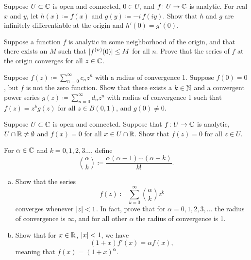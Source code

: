 \begin{exercise}
Suppose $U \subset {\mathbb{C}}$ is open and connected, $0 \in U$, and $f \colon U
\to {\mathbb{C}}$ is analytic.  For real $x$ and $y$,
let $h(x) \coloneqq f(x)$ and $g(y) \coloneqq -i \, f(iy)$.
Show that $h$ and $g$ are infinitely differentiable at the origin and
$h'(0) = g'(0)$.
\end{exercise}

\begin{exercise}
Suppose a function $f$ is analytic in some neighborhood of the origin,
and that there exists an $M$
such that $\lvert {f^{(n)}(0)} \rvert \leq M$ for all $n$.
Prove that the series of $f$ at the origin converges for all $z \in {\mathbb{C}}$.
\end{exercise}

\begin{exercise}
Suppose $f(z) \coloneqq \sum_{n=0}^\infty c_n z^n$ with a radius of convergence 1.  Suppose $f(0)
= 0$, but $f$ is not the zero function.
Show that there exists a $k \in {\mathbb{N}}$ and a convergent
power series $g(z) \coloneqq \sum_{n=0}^\infty d_n z^n$ with radius of convergence 1
such that $f(z) = z^k g(z)$ for all $z \in B(0,1)$, and $g(0) \not= 0$.
\end{exercise}

\begin{exercise}
Suppose $U \subset {\mathbb{C}}$ is open and connected.  Suppose that
$f \colon U \to {\mathbb{C}}$ is analytic, $U \cap {\mathbb{R}} \not= \emptyset$ and
$f(x) = 0$ for all $x \in U \cap {\mathbb{R}}$.  Show that $f(z) = 0$ for all $z \in
U$.
\end{exercise}

\begin{exercise}
For $\alpha \in {\mathbb{C}}$ and $k=0,1,2,3\ldots$, define
\begin{equation*}
\binom{\alpha}{k} \coloneqq \frac{\alpha(\alpha-1)\cdots(\alpha-k)}{k!} .
\end{equation*}
\begin{enumerate}[a)]
\item
Show that the series
\begin{equation*}
f(z) \coloneqq \sum_{k=0}^\infty \binom{\alpha}{k} z^k
\end{equation*}
converges whenever $\left\lvert {z} \right\rvert < 1$.
In fact, prove that for $\alpha = 0,1,2,3,\ldots$ the radius of
convergence is $\infty$, and for all other $\alpha$
the radius of convergence is 1.
\item
Show that for $x \in {\mathbb{R}}$, $\left\lvert {x} \right\rvert < 1$, we have
\begin{equation*}
(1+x) f'(x) = \alpha f(x) ,
\end{equation*}
meaning that $f(x) = (1+x)^\alpha$.
\end{enumerate}
\end{exercise}


